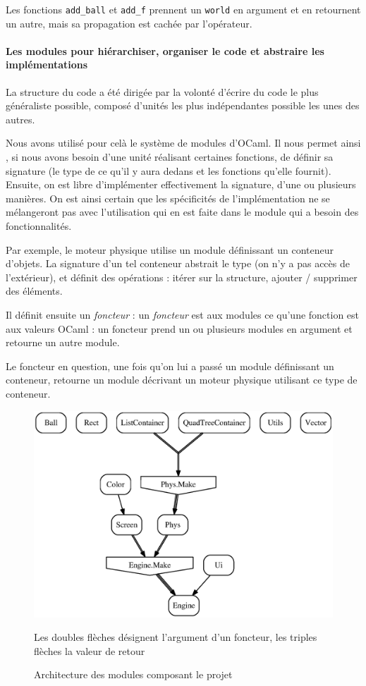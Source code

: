 \documentclass[a4paper]{scrartcl}
\begin{document}
Les fonctions \texttt{add\_ball} et \texttt{add\_f} prennent un
\texttt{world} en argument et en retournent un autre, mais sa
propagation est cachée par l'opérateur.

\paragraph{Les modules pour hiérarchiser, organiser le code et
  abstraire les implémentations}

La structure du code a été dirigée par la volonté d'écrire du code le
plus généraliste possible, composé d'unités les plus indépendantes
possible les unes des autres.

Nous avons utilisé pour celà le système de modules d'OCaml. Il nous
permet ainsi , si nous avons besoin d'une unité réalisant certaines
fonctions, de définir sa signature (le type de ce qu'il y aura dedans
et les fonctions qu'elle fournit). Ensuite, on est libre d'implémenter
effectivement la signature, d'une ou plusieurs manières. On est ainsi
certain que les spécificités de l'implémentation ne se mélangeront pas
avec l'utilisation qui en est faite dans le module qui a besoin des
fonctionnalités.

Par exemple, le moteur physique utilise un module définissant un
conteneur d'objets. La signature d'un tel conteneur abstrait le type
(on n'y a pas accès de l'extérieur), et définit des opérations :
itérer sur la structure, ajouter / supprimer des éléments.

Il définit ensuite un \emph{foncteur} : un \emph{foncteur} est aux
modules ce qu'une fonction est aux valeurs OCaml : un foncteur prend
un ou plusieurs modules en argument et retourne un autre module.

Le foncteur en question, une fois qu'on lui a passé un module
définissant un conteneur, retourne un module décrivant un moteur
physique utilisant ce type de conteneur.

\begin{figure}[h]
  \centering
  \includegraphics[scale = 0.7]{modules.eps}  
  \caption{Architecture des modules composant le projet}
  Les doubles flèches désignent l'argument d'un foncteur, les triples
  flèches la valeur de retour
  \label{fig:modules}
\end{figure}
\end{document}
